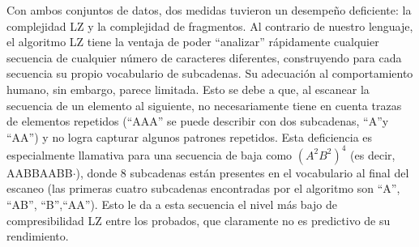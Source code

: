 
Con ambos conjuntos de datos, dos medidas tuvieron un desempeño deficiente: la complejidad LZ y la complejidad de fragmentos. Al contrario de nuestro lenguaje, el algoritmo LZ tiene la ventaja de poder ``analizar'' rápidamente cualquier secuencia de cualquier número de caracteres diferentes, construyendo para cada secuencia su propio vocabulario de subcadenas. Su adecuación al comportamiento humano, sin embargo, parece limitada. Esto se debe a que, al escanear la secuencia de un elemento al siguiente, no necesariamente tiene en cuenta trazas de elementos repetidos (``AAA'' se puede describir con dos subcadenas, ``A''y ``AA'') y no logra capturar algunos patrones repetidos. Esta deficiencia es especialmente llamativa para una secuencia de baja \mdlbin como $(A^2B^2)^4$ (es decir, AABBAABB$\cdot$), donde 8 subcadenas están presentes en el vocabulario al final del escaneo (las primeras cuatro subcadenas encontradas por el algoritmo son ``A'', ``AB'', ``B'',``AA''). Esto le da a esta secuencia el nivel más bajo de compresibilidad LZ entre los probados, que claramente no es predictivo de su rendimiento.

